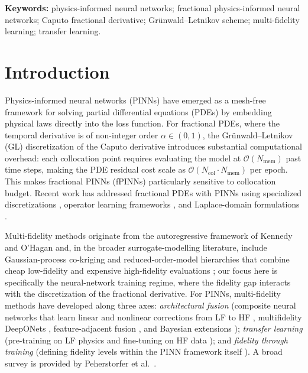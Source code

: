\documentclass[11pt]{article}
\newcommand{\Ncol}{N_{\mathrm{col}}}
\begin{document}
\noindent\textbf{Keywords:} physics-informed neural networks; fractional physics-informed
neural networks; Caputo fractional derivative; Gr\"{u}nwald--Letnikov scheme; multi-fidelity
learning; transfer learning.

\vspace{1em}

\section{Introduction}
\label{sec:intro}

Physics-informed neural networks (PINNs) \cite{raissi2019physics,karniadakis2021physics,lu2021deepxde} have emerged as a mesh-free framework for solving partial differential equations (PDEs) by embedding physical laws directly into the loss function. For fractional PDEs, where the temporal derivative is of non-integer order $\alpha \in (0,1)$, the Gr\"unwald--Letnikov (GL) discretization of the Caputo derivative introduces substantial computational overhead: each collocation point requires evaluating the model at $\mathcal{O}(N_{\mathrm{mem}})$ past time steps, making the PDE residual cost scale as $\mathcal{O}(\Ncol \cdot N_{\mathrm{mem}})$ per epoch. This makes fractional PINNs (fPINNs) \cite{pang2019fpinns} particularly sensitive to collocation budget. Recent work has addressed fractional PDEs with PINNs using specialized discretizations \cite{zhao2025fdiff}, operator learning frameworks \cite{lin2025fpinn}, and Laplace-domain formulations \cite{yan2023laplace,wang2025laplace,liu2025lt}.

Multi-fidelity methods originate from the autoregressive framework of Kennedy and O'Hagan \cite{kennedy2000predicting} and, in the broader surrogate-modelling literature, include Gaussian-process co-kriging and reduced-order-model hierarchies that combine cheap low-fidelity and expensive high-fidelity evaluations \cite{kennedy2000predicting,peherstorfer2018survey}; our focus here is specifically the neural-network training regime, where the fidelity gap interacts with the discretization of the fractional derivative. For PINNs, multi-fidelity methods have developed along three axes: \emph{architectural fusion} (composite neural networks that learn linear and nonlinear corrections from LF to HF \cite{meng2020composite}, multifidelity DeepONets \cite{howard2023multifidelity}, feature-adjacent fusion \cite{chen2024feature}, and Bayesian extensions \cite{chen2026mf}); \emph{transfer learning} (pre-training on LF physics and fine-tuning on HF data \cite{chakraborty2021transfer,goswami2020transfer,de2023multifidelity}); and \emph{fidelity through training} (defining fidelity levels within the PINN framework itself \cite{muralidhar2022multifidelity}). A broad survey is provided by Peherstorfer et al.\ \cite{peherstorfer2018survey}.
\end{document}
